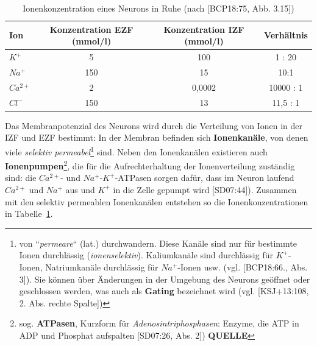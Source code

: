{\renewcommand{\arraystretch}{1.5}%
\begin{table} %
 \centering
 \begin{tabular}{l | c | c | c }
  \textbf{Ion} & \textbf{Konzentration EZF (mmol/l)} & \textbf{Konzentration IZF (mmol/l)} & \textbf{Verhältnis} \\
  \hline
  $K^+$      & 5 & 100 & 1 : 20 \\
  $Na^+$     & 150 & 15 & 10:1 \\
  $Ca^{2+}$  & 2 & 0,0002 & 10000 : 1 \\
  $Cl^-$     & 150 & 13 & 11,5 : 1 \\
 \end{tabular}
 \caption{Ionenkonzentration eines Neurons in Ruhe (nach {[BCP18:75, Abb. 3.15]})}
 \label{tab:ionenkonzentration}
\end{table}


Das Membranpotenzial des Neurons wird durch die Verteilung von Ionen in der IZF und EZF bestimmt: In der Membran befinden sich \textbf{Ionenkanäle}, von denen viele \textit{selektiv permeabel}\footnote{
 von ``\textit{permeare}`` (lat.) durchwandern. Diese Kanäle sind nur für bestimmte Ionen durchlässig (\textit{ionenselektiv}). Kaliumkanäle sind durchlässig für $K^+$-Ionen, Natriumkanäle durchlässig für $Na^+$-Ionen usw. (vgl. {[BCP18:66., Abs. 3]}).
 Sie können über Änderungen in der Umgebung des Neurons geöffnet oder geschlossen werden, was auch als \textbf{Gating} bezeichnet wird (vgl. {[KSJ+13:108, 2. Abs. rechte Spalte]})
} sind.
Neben den Ionenkanälen existieren auch \textbf{Ionenpumpen}\footnote{
 sog. \textbf{ATPasen}, Kurzform für \textit{Adenosintriphosphasen}: Enzyme, die ATP in ADP und Phosphat aufspalten {[SD07:26, Abs. 2]}) \textbf{QUELLE}
}, die für die Aufrechterhaltung der Ionenverteilung zuständig sind: die $Ca^{2+}$- und $Na^+$-$K^+$-ATPasen sorgen dafür, dass im Neuron laufend  $Ca^{2+}$ und $Na^+$ aus und $K^+$ in die Zelle gepumpt wird [SD07:44]).
Zusammen mit den selektiv permeablen Ionenkanälen entstehen so die Ionenkonzentrationen in Tabelle~\ref{tab:ionenkonzentration}.\\


}

